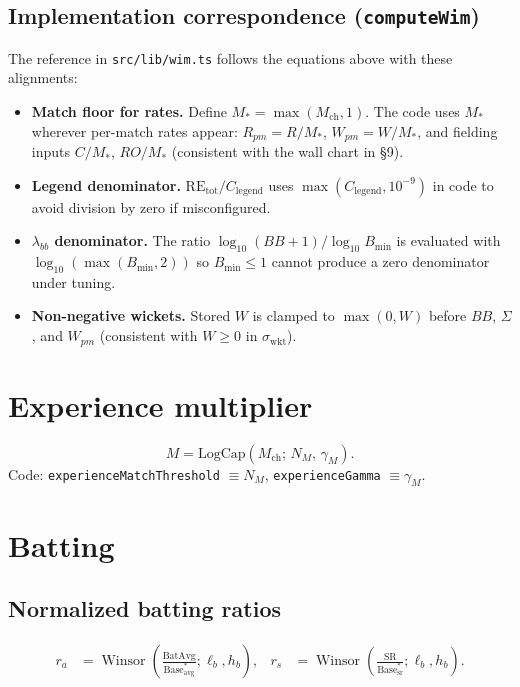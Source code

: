\documentclass[12pt,a4paper]{article}
\newcommand{\winsor}{\operatorname{Winsor}}
\begin{document}
\subsection{Implementation correspondence (\texttt{computeWim})}
The reference in \texttt{src/lib/wim.ts} follows the equations above with these alignments:
\begin{itemize}
  \item \textbf{Match floor for rates.} Define $M_\ast=\max(M_{\mathrm{ch}},1)$. The code uses $M_\ast$ wherever per-match rates appear: $R_{pm}=R/M_\ast$, $W_{pm}=W/M_\ast$, and fielding inputs $C/M_\ast$, $RO/M_\ast$ (consistent with the wall chart in \S9).
  \item \textbf{Legend denominator.} $\mathrm{RE}_{\mathrm{tot}}/C_{\mathrm{legend}}$ uses $\max(C_{\mathrm{legend}},10^{-9})$ in code to avoid division by zero if misconfigured.
  \item \textbf{$\lambda_{bb}$ denominator.} The ratio $\log_{10}(BB+1)/\log_{10}B_{\min}$ is evaluated with $\log_{10}(\max(B_{\min},2))$ so $B_{\min}\le 1$ cannot produce a zero denominator under tuning.
  \item \textbf{Non-negative wickets.} Stored $W$ is clamped to $\max(0,W)$ before $BB$, $\Sigma$, and $W_{pm}$ (consistent with $W\ge 0$ in $\sigma_{\mathrm{wkt}}$).
\end{itemize}

\section{Experience multiplier}
\begin{equation}
  M = \mathrm{LogCap}(M_{\mathrm{ch}};\,N_M,\,\gamma_M).
\end{equation}
Code: \texttt{experienceMatchThreshold} $\equiv N_M$, \texttt{experienceGamma} $\equiv \gamma_M$.

\section{Batting}
\subsection{Normalized batting ratios}
\begin{align}
  r_a &= \winsor\!\left(\frac{\mathrm{BatAvg}}{\mathrm{Base}^\ast_{\mathrm{avg}}};\ell_b,h_b\right), &
  r_s &= \winsor\!\left(\frac{\mathrm{SR}}{\mathrm{Base}^\ast_{\mathrm{sr}}};\ell_b,h_b\right).
\end{align}
\end{document}
